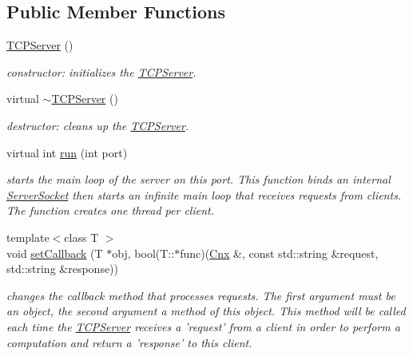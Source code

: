 \subsection*{Public Member Functions}
\begin{DoxyCompactItemize}
\item 
\hypertarget{class_t_c_p_server_a3a5e3cfe42c676ed71f2bc58dcc92bda}{\hyperlink{class_t_c_p_server_a3a5e3cfe42c676ed71f2bc58dcc92bda}{T\-C\-P\-Server} ()}\label{class_t_c_p_server_a3a5e3cfe42c676ed71f2bc58dcc92bda}

\begin{DoxyCompactList}\small\item\em constructor\-: initializes the \hyperlink{class_t_c_p_server}{T\-C\-P\-Server}. \end{DoxyCompactList}\item 
\hypertarget{class_t_c_p_server_abc497ac52355e53986a6a1bd1acb9581}{virtual \hyperlink{class_t_c_p_server_abc497ac52355e53986a6a1bd1acb9581}{$\sim$\-T\-C\-P\-Server} ()}\label{class_t_c_p_server_abc497ac52355e53986a6a1bd1acb9581}

\begin{DoxyCompactList}\small\item\em destructor\-: cleans up the \hyperlink{class_t_c_p_server}{T\-C\-P\-Server}. \end{DoxyCompactList}\item 
virtual int \hyperlink{class_t_c_p_server_a1409041961e91f1dbc4933483b4c3b23}{run} (int port)
\begin{DoxyCompactList}\small\item\em starts the main loop of the server on this port. This function binds an internal \hyperlink{class_server_socket}{Server\-Socket} then starts an infinite main loop that receives requests from clients. The function creates one thread per client. \end{DoxyCompactList}\item 
{\footnotesize template$<$class T $>$ }\\void \hyperlink{class_t_c_p_server_ac62c8c7a1d1137b74e2a1fa6d8a4a876}{set\-Callback} (T $\ast$obj, bool(T\-::$\ast$func)(\hyperlink{class_t_c_p_server_1_1_cnx}{Cnx} \&, const std\-::string \&request, std\-::string \&response))
\begin{DoxyCompactList}\small\item\em changes the callback method that processes requests. The first argument must be an object, the second argument a method of this object. This method will be called each time the \hyperlink{class_t_c_p_server}{T\-C\-P\-Server} receives a 'request' from a client in order to perform a computation and return a 'response' to this client. \end{DoxyCompactList}\end{DoxyCompactItemize}
